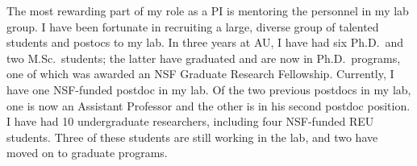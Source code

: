 \documentclass[letterpaper, 10pt]{letter}
\begin{document}
\begin{letter}
The most rewarding part of my role as a PI is mentoring the personnel in my lab
group.
I have been fortunate in recruiting a large, diverse group of talented
students and postocs to my lab.
In three years at AU, I have had six Ph.D.\ and two M.Sc.\ students;
the latter have graduated and are now in Ph.D.\ programs, one of which
was awarded an NSF Graduate Research Fellowship.
Currently, I have one NSF-funded postdoc in my lab.
Of the two previous postdocs in my lab, one is now an Assistant Professor and
the other is in his second postdoc position.
I have had 10 undergraduate researchers, including four NSF-funded
REU students.
Three of these students are still working in the lab,
and two have moved on to graduate programs.






\end{letter}
\end{document}
